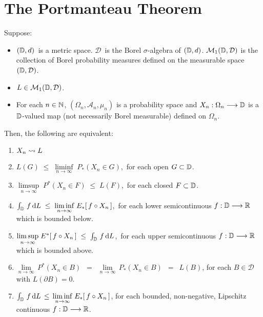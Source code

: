 

\section{The Portmanteau Theorem}
\setcounter{theorem}{0}
\setcounter{equation}{0}


\renewcommand{\theenumi}{\roman{enumi}}
\renewcommand{\labelenumi}{\textnormal{(\theenumi)}$\;\;$}


\begin{theorem}
\mbox{}\vskip 0.1cm
\noindent
Suppose:
\begin{itemize}
\item
	$(\mathbb{D},d)$\, is a metric space.
	$\mathcal{D}$\, is the Borel $\sigma$-algebra of $(\mathbb{D},d)$.
	\vskip 0.0cm
	$\mathcal{M}_{1}(\mathbb{D},\mathcal{D})$ is the collection of Borel probability measures
	defined on the measurable space $(\mathbb{D},\mathcal{D})$.
\item
	$L \in \mathcal{M}_{1}(\mathbb{D},\mathcal{D})$.
\item
	For each $n \in \mathbb{N}$,
	$(\Omega_{n},\mathcal{A}_{n},\mu_{n})$ is a probability space and
	$X_{n} : \Omega_{n} \longrightarrow \mathbb{D}$
	is a $\mathbb{D}$-valued map (not necessarily Borel measurable) defined on $\Omega_{n}$.
\end{itemize}
Then, the following are equivalent:
\begin{enumerate}
\item
	$X_{n} \rightsquigarrow L$
\item
	$L(G) \;\leq\; \underset{n\rightarrow\infty}{\liminf}\; P_{*}(X_{n} \in G)$,\, for each open $G \subset \mathbb{D}$.
\item
	$\underset{n\rightarrow\infty}{\limsup}\; P^{*}(X_{n} \in F) \;\leq\; L(F)$,\, for each closed $F \subset \mathbb{D}$.
\item
	$\int_{\mathbb{D}}\, f \,\textnormal{d} L \;\leq\; \underset{n\rightarrow\infty}{\liminf}\; E_{*}\!\left[\,f \circ X_{n}\,\right]$,\,
	for each lower semicontinuous $f : \mathbb{D} \longrightarrow \mathbb{R}$ which is bounded below.
\item
	$\underset{n\rightarrow\infty}{\limsup}\; E^{*}\!\left[\,f \circ X_{n}\,\right] \;\leq\; \int_{\mathbb{D}}\, f \,\textnormal{d} L$,\,
	for each upper semicontinuous $f : \mathbb{D} \longrightarrow \mathbb{R}$ which is bounded above.
\item
	$\underset{n\rightarrow\infty}{\lim}\,P^{*}(X_{n} \in B)$
	\,$=$\, $\underset{n\rightarrow\infty}{\lim}\,P_{*}(X_{n} \in B)$
	\,$=$\, $L(B)$,
	for each $B \in \mathcal{D}$ with $L(\partial B) = 0$.
\item
	$\int_{\mathbb{D}}\,f\,\textnormal{d} L \,\leq\, \underset{n\rightarrow\infty}{\liminf}\;E_{*}\!\left[\,f \circ X_{n}\,\right]$,
	for each bounded, non-negative, Lipschitz continuous $f : \mathbb{D} \longrightarrow \mathbb{R}$.
\end{enumerate}
\end{theorem}
\proof

